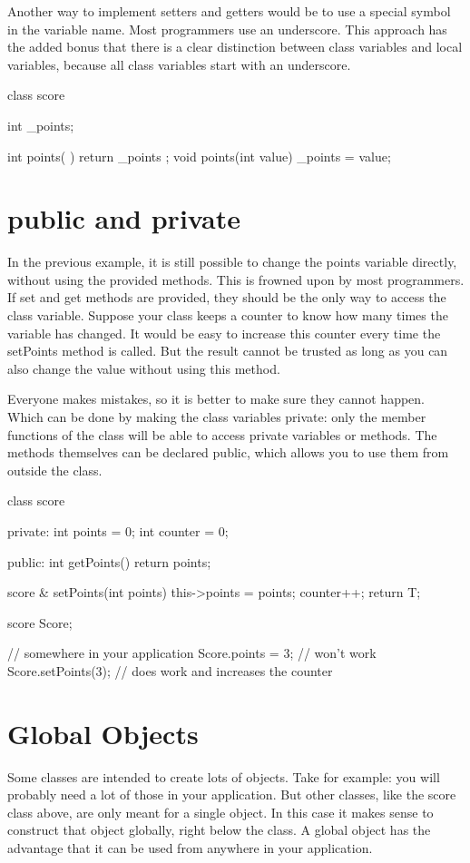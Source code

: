 Another way to implement setters and getters would be to use a special symbol in the variable name. Most programmers use an underscore. This approach has the added bonus that there is a clear distinction between class variables and local variables, because all class variables start with an underscore.

\begin{code}
class score {
  int _points;
  
  int  points(         ) { return _points ; }
  void points(int value) { _points = value; }
}
\end{code}

\section{public and private}
In the previous example, it is still possible to change the points variable directly, without using the provided methods. This is frowned upon by most programmers. If set and get methods are provided, they should be the only way to access the class variable. Suppose your class keeps a counter to know how many times the variable has changed. It would be easy to increase this counter every time the setPoints method is called. But the result cannot be trusted as long as you can also change the value without using this method.

Everyone makes mistakes, so it is better to make sure they cannot happen. Which can be done by making the class variables private: only the member functions of the class will be able to access private variables or methods. The methods themselves can be declared public, which allows you to use them from outside the class.

\begin{code}
class score {
private:
  int points  = 0;
  int counter = 0;
  
public:  
  int getPoints() {
    return points;
  }
  
  score & setPoints(int points) {
    this->points = points;
    counter++;
    return T;
  } 
}
score Score;

// somewhere in your application
Score.points = 3; // won't work
Score.setPoints(3); // does work and increases the counter
\end{code}

\section{Global Objects}
Some classes are intended to create lots of objects. Take  for example: you will probably need a lot of those in your application. But other classes, like the score class above, are only meant for a single object. In this case it makes sense to construct that object globally, right below the class. A global object has the advantage that it can be used from anywhere in your application.

